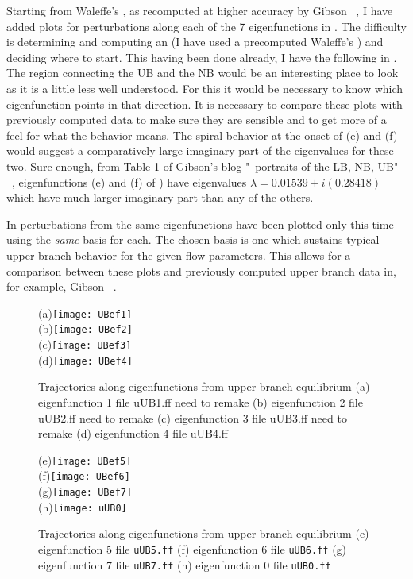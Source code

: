\documentclass[pre,twocolumn,groupedaddress]{revtex4}
\begin{document}
{Starting from Waleffe's {\ubranch}, as recomputed at higher accuracy
by Gibson ~\cite{PCFdata}, I have added plots for perturbations
along each of the 7 eigenfunctions in
. The difficulty
is determining and computing an {\eqv} (I have used a precomputed
Waleffe's {\ubranch}) and deciding where to start. This having been
done already, I have the following in
. The region
connecting the UB and the NB would be an interesting place to look
as it is a little less well understood. For this it would be
necessary to know which eigenfunction points in that direction. It
is necessary to compare these plots with previously computed data to
make sure they are sensible and to get more of a feel for what the
behavior means. The spiral behavior at the onset of (e) and (f)
would suggest a comparatively large imaginary part of the
eigenvalues for these two.  Sure
enough, from Table 1 of Gibson's blog "\Statesp\ portraits of the
LB, NB, UB" ~\cite{state-space}, eigenfunctions (e) and (f) of
) have eigenvalues $ \lambda = 0.01539 +
i(0.28418)$ which have much larger imaginary part than any of the
others.

In  perturbations
from the same eigenfunctions have been plotted only this time using
the \emph{same} basis for each. The chosen basis is one which
sustains typical upper branch behavior for the given flow
parameters. This allows for a comparison between these plots and
previously computed upper branch data in, for example, Gibson
~\cite{state-space}.


\newpage
\begin{figure}[htbp]
  (a)\texttt{[image: UBef1]}\\
  (b)\texttt{[image: UBef2]}\\
  (c)\texttt{[image: UBef3]}\\
  (d)\texttt{[image: UBef4]}
 \caption{Trajectories along eigenfunctions from upper branch
  equilibrium
    (a) eigenfunction 1 file uUB1.ff need to remake
    (b) eigenfunction 2 file uUB2.ff need to remake
    (c) eigenfunction 3 file uUB3.ff need to remake
    (d) eigenfunction 4 file uUB4.ff
} \label{eltonFig:UBefs1/old}
\end{figure}

\begin{figure}[htbp]
  (e)\texttt{[image: UBef5]}\\
  (f)\texttt{[image: UBef6]}\\
  (g)\texttt{[image: UBef7]}\\
  (h)\texttt{[image: uUB0]}\\
  \caption{
  Trajectories along eigenfunctions from upper branch equilibrium
    (e) eigenfunction 5 file {\tt uUB5.ff}
    (f) eigenfunction 6 file {\tt uUB6.ff}
    (g) eigenfunction 7 file {\tt uUB7.ff}
    (h) eigenfunction 0 file {\tt uUB0.ff}
          }
  \label{eltonFig:UBefs2/old}
\end{figure}

}
\end{document}
